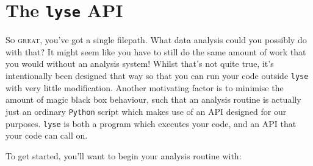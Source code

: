 \documentclass[a4paper,11pt,titlepage]{article}
\begin{document}
\section{The \texttt{lyse} API}
\lettrine[lines=3]{S}{o great,}  you've got a single filepath. What data analysis could you possibly do with that? It might seem like you have to still do the same amount of work that you would without an analysis system! Whilst that's not quite true, it's intentionally been designed that way so that you can run your code outside \texttt{lyse} with very little modification. Another motivating factor is to minimise the amount of magic black box behaviour, such that an analysis routine is actually just an ordinary \texttt{Python} script which makes use of an API designed for our purposes. \texttt{lyse} is both a program which executes your code, and an API that your code can call on.

To get started, you'll want to begin your analysis routine with:
\end{document}
